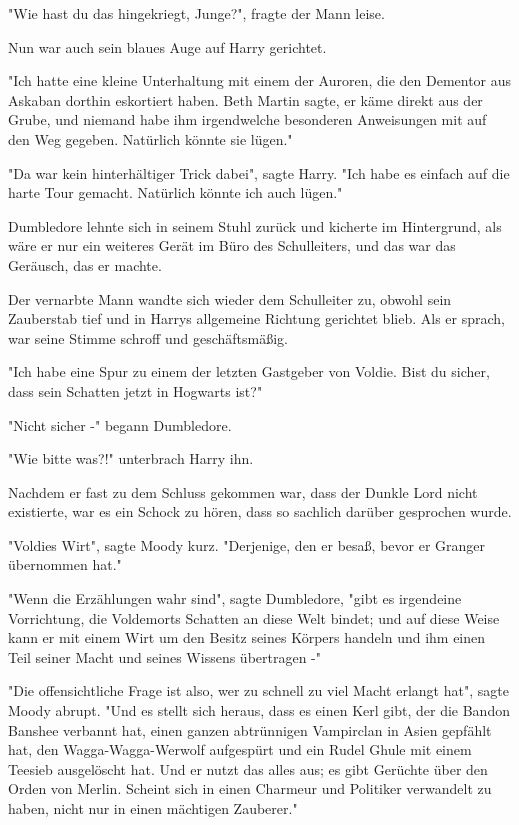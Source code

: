 {"Wie hast du das hingekriegt, Junge?", fragte der Mann leise.

Nun war auch sein blaues Auge auf Harry gerichtet.

"Ich hatte eine kleine Unterhaltung mit einem der Auroren, die den Dementor aus Askaban dorthin eskortiert haben. Beth Martin sagte, er käme direkt aus der Grube, und niemand habe ihm irgendwelche besonderen Anweisungen mit auf den Weg gegeben. Natürlich könnte sie lügen."

"Da war kein hinterhältiger Trick dabei", sagte Harry. "Ich habe es einfach auf die harte Tour gemacht. Natürlich könnte ich auch lügen."

Dumbledore lehnte sich in seinem Stuhl zurück und kicherte im Hintergrund, als wäre er nur ein weiteres Gerät im Büro des Schulleiters, und das war das Geräusch, das er machte.

Der vernarbte Mann wandte sich wieder dem Schulleiter zu, obwohl sein Zauberstab tief und in Harrys allgemeine Richtung gerichtet blieb. Als er sprach, war seine Stimme schroff und geschäftsmäßig.

"Ich habe eine Spur zu einem der letzten Gastgeber von Voldie. Bist du sicher, dass sein Schatten jetzt in Hogwarts ist?"

"Nicht sicher -" begann Dumbledore.

"Wie bitte was?!" unterbrach Harry ihn.

Nachdem er fast zu dem Schluss gekommen war, dass der Dunkle Lord nicht existierte, war es ein Schock zu hören, dass so sachlich darüber gesprochen wurde.

"Voldies Wirt", sagte Moody kurz. "Derjenige, den er besaß, bevor er Granger übernommen hat."

"Wenn die Erzählungen wahr sind", sagte Dumbledore, "gibt es irgendeine Vorrichtung, die Voldemorts Schatten an diese Welt bindet; und auf diese Weise kann er mit einem Wirt um den Besitz seines Körpers handeln und ihm einen Teil seiner Macht und seines Wissens übertragen -"

"Die offensichtliche Frage ist also, wer zu schnell zu viel Macht erlangt hat", sagte Moody abrupt. "Und es stellt sich heraus, dass es einen Kerl gibt, der die Bandon Banshee verbannt hat, einen ganzen abtrünnigen Vampirclan in Asien gepfählt hat, den Wagga-Wagga-Werwolf aufgespürt und ein Rudel Ghule mit einem Teesieb ausgelöscht hat. Und er nutzt das alles aus; es gibt Gerüchte über den Orden von Merlin. Scheint sich in einen Charmeur und Politiker verwandelt zu haben, nicht nur in einen mächtigen Zauberer."

}
